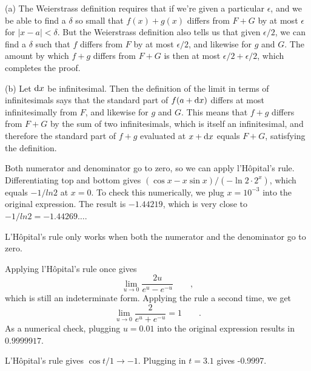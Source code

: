 
(a) The Weierstrass definition requires that if we're given a particular $\epsilon$, and we be able to find a $\delta$ so small that $f(x)+g(x)$
differs from $F+G$ by at most $\epsilon$ for $|x-a|<\delta$. But the Weierstrass definition also tells us that given $\epsilon/2$, we can find
a $\delta$ such that $f$ differs from $F$ by at most $\epsilon/2$, and likewise for $g$ and $G$. The amount by which $f+g$ differs from $F+G$
is then at most $\epsilon/2+\epsilon/2$, which completes the proof.

(b) Let $\textup{d} x$ be infinitesimal. Then the definition of the limit in terms of infinitesimals says that the standard part of $f(a+\textup{d} x)$
differs at most infinitesimally from $F$, and likewise for $g$ and $G$. This means that $f+g$ differs from $F+G$ by the sum of two infinitesimals,
which is itself an infinitesimal, and therefore the standard part of $f+g$ evaluated at $x+\textup{d} x$ equals $F+G$, satisfying the definition.


Both numerator and denominator go to zero, so we can apply l'H\^{o}pital's rule. Differentiating top and bottom gives
$(\cos x-x\sin x)/(-\ln 2 \cdot 2^x)$, which equals $-1/ln 2$ at $x=0$. To check this numerically, we plug 
$x=10^{-3}$ into the original expression. The result is $-1.44219$, which is very close to $-1/ln 2=-1.44269\ldots$.


L'H\^{o}pital's rule only works when both the numerator and the denominator go to zero.

Applying l'H\^{o}pital's rule once gives
\begin{equation*}
  \lim_{u\rightarrow 0} \frac{2u}{e^u-e^{-u}} \qquad ,
\end{equation*}
which is still an indeterminate form. Applying the rule a second time, we get
\begin{equation*}
  \lim_{u\rightarrow 0} \frac{2}{e^u+e^{-u}} = 1 \qquad .
\end{equation*}
As a numerical check, plugging $u=0.01$ into the original expression results
in $0.9999917$.

L'H\^{o}pital's rule gives $\cos t/1\rightarrow -1$. Plugging in $t=3.1$
gives -0.9997.


